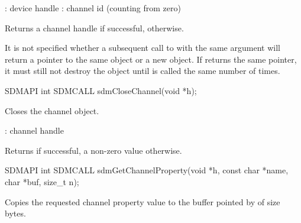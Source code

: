 \documentclass[a4paper,12pt,twoside,extrafontsizes]{memoir}
\begin{document}
\begin{funcparams}
	: device handle
	: channel id (counting from zero)
\end{funcparams}

\begin{funcret}
	Returns a channel handle if successful,  otherwise.
\end{funcret}

\begin{funcremarks}
	It is not specified whether a subsequent call to  with the same  argument will return a pointer to the same object or a new object. If  returns the same pointer, it must still not destroy the object until  is called the same number of times.
\end{funcremarks}



\begin{cfuncprototype}
SDMAPI int SDMCALL sdmCloseChannel(void *h);
\end{cfuncprototype}

\begin{funcdescr}
	Closes the channel object.
\end{funcdescr}

\begin{funcparams}
	: channel handle
\end{funcparams}

\begin{funcret}
	Returns  if successful, a non-zero value otherwise.
\end{funcret}



\begin{cfuncprototype}
SDMAPI int SDMCALL sdmGetChannelProperty(void *h, const char *name, char *buf, size_t n);
\end{cfuncprototype}

\begin{funcdescr}
	Copies the requested channel property value to the buffer pointed by  of size  bytes.
\end{funcdescr}
\end{document}
